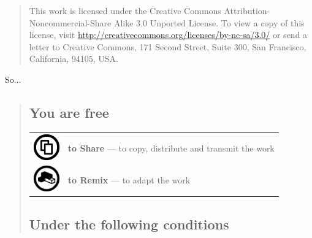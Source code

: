 \documentclass[ipa,twoside]{report}
\begin{document}
\begin{quotation}
This work is licensed under the Creative Commons Attribution-Noncommercial-Share Alike 3.0 Unported License. To view a copy of this license, visit \url{http://creativecommons.org/licenses/by-nc-sa/3.0/} or send a letter to Creative Commons, 171 Second Street, Suite 300, San Francisco, California, 94105, USA.
\end{quotation}

So...
\begin{quotation}

\subsection*{You are free}

\begin{tabular}{T S}%
  \includegraphics[width=3em]{img/sharelarge.png} & \textbf{to Share} --- to copy, distribute and transmit the work  \\
  \includegraphics[width=3em]{img/remixlarge.png} & \textbf{to Remix} --- to adapt the work  \\
\end{tabular}

\subsection*{Under the following conditions}


\end{quotation}
\end{document}
